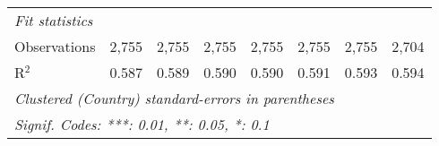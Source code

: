 \begin{tabular}{lccccccc}
   \midrule \emph{Fit statistics}\\
   Observations                                                                     & 2,755   & 2,755        & 2,755         & 2,755        & 2,755        & 2,755          & 2,704\\  
   R$^2$                                                                            & 0.587   & 0.589        & 0.590         & 0.590        & 0.591        & 0.593          & 0.594\\  
   \midrule
   \multicolumn{8}{l}{\emph{Clustered (Country) standard-errors in parentheses}}\\
   \multicolumn{8}{l}{\emph{Signif. Codes: ***: 0.01, **: 0.05, *: 0.1}}\\
\end{tabular}
\par\endgroup


